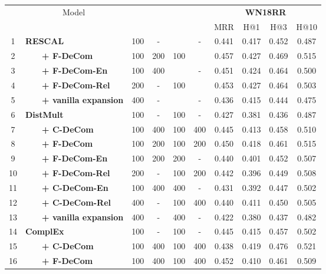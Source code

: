 \documentclass[letterpaper]{article} \usepackage{aaai20}  \usepackage{times}  \usepackage{helvet} \usepackage{courier}  \usepackage{booktabs}
\begin{document}
\begin{table*}[t]
    \centering
    \begin{tabular}{|c|l|cccc|cccc|}
    \toprule
        \bf\multirow{2}{*}{\#} & \multirow{2}{*}{~~~~~~~~~Model} & \multirow{2}{*}{} &
        \multirow{2}{*}{} &
        \multirow{2}{*}{} &
        \multirow{2}{*}{} &
        \multicolumn{4}{|c|}{\textbf{WN18RR}}   \\
        & & & & & &  MRR & H@1 & H@3&  H@10\\
         \midrule
         1 & \textbf{RESCAL} & 100 & - &  & - & 0.441 & 0.417 & 0.452 & 0.487\\
         2 &~~~~\textbf{+ F-DeCom} & 100 & 200 & 100 &  & 0.457 & 0.427 & 0.469 & 0.515\\
         3 &~~~~\textbf{+ F-DeCom-En} & 100 & 400 &  & - & 0.451 & 0.424 & 0.464 & 0.500 \\
         4 & ~~~~\textbf{+ F-DeCom-Rel} & 200 & - & 100 &  & 0.453 & 0.427 & 0.464 & 0.503 \\
         5 &~~~~\textbf{+ vanilla expansion} & 400 & - &  & - & 0.436 & 0.415 & 0.444 & 0.475\\
         \midrule
         6 & \textbf{DistMult} & 100 & - & 100 & - & 0.427 & 0.381 & 0.436 & 0.487\\
         7 & ~~~~\textbf{+ C-DeCom}& 100 & 400 & 100 & 400 & 0.445 & 0.413 & 0.458 & 0.510\\
         8 & ~~~~\textbf{+ F-DeCom}& 100 & 200 & 100 & 200 & 0.450 & 0.418 & 0.461 & 0.515\\
         9 & ~~~~\textbf{+ F-DeCom-En} & 100 & 200 & 200 & - & 0.440 & 0.401 & 0.452 & 0.507\\
         10 & ~~~~\textbf{+ F-DeCom-Rel} & 200 & - & 100 & 200 & 0.442 & 0.396 & 0.449 & 0.508\\
         11 & ~~~~\textbf{+ C-DeCom-En} & 100 & 400 & 400 & - & 0.431 & 0.392 & 0.447 & 0.502\\
         12 & ~~~~\textbf{+ C-DeCom-Rel} & 400 & - & 100 & 400 & 0.440 & 0.411 & 0.450 & 0.505\\
         13 & ~~~~\textbf{+ vanilla expansion} & 400 & - & 400 & - & 0.422 & 0.380 & 0.437 & 0.482\\
         \midrule
         14 & \textbf{ComplEx} & 100 & - & 100 & - & 0.445 & 0.415 & 0.457 & 0.502\\
         15 &~~~~\textbf{+ C-DeCom} & 100 & 400 & 100 & 400 & 0.438 & 0.419 & 0.476 & 0.521\\
         16 &~~~~\textbf{+ F-DeCom} & 100 & 400 & 100 & 400 & 0.452 & 0.410 & 0.461 & 0.509\\

\end{tabular}
\end{table*}
\end{document}
